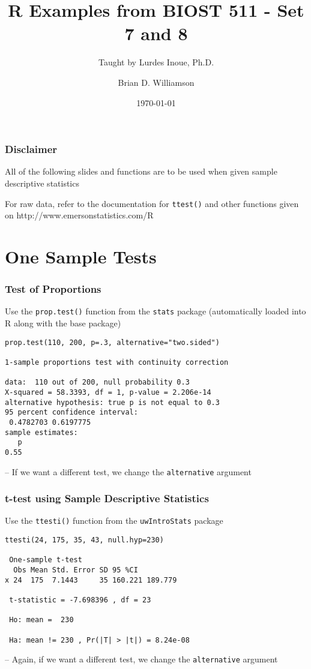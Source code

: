 \documentclass[pdf]{beamer}
\title{R Examples from BIOST 511 - Set 7 and 8}
\subtitle{Taught by Lurdes Inoue, Ph.D.}
\author{Brian D. Williamson}
\institute{University of Washington \\ Department of Biostatistics}
\date{\today}
\begin{document}
\begin{frame}
\titlepage
\end{frame}

\begin{frame}
\frametitle{Disclaimer}
All of the following slides and functions are to be used when given sample descriptive statistics

For raw data, refer to the documentation for \texttt{ttest()} and other functions given on http://www.emersonstatistics.com/R
\end{frame}
\section{One Sample Tests}
\begin{frame}[fragile]
\frametitle{Test of Proportions}
Use the \texttt{prop.test()} function from the \texttt{stats} package (automatically loaded into R along with the base package)
{\fontsize{6pt}{7.2}\selectfont
\begin{verbatim}
prop.test(110, 200, p=.3, alternative="two.sided")

1-sample proportions test with continuity correction

data:  110 out of 200, null probability 0.3
X-squared = 58.3393, df = 1, p-value = 2.206e-14
alternative hypothesis: true p is not equal to 0.3
95 percent confidence interval:
 0.4782703 0.6197775
sample estimates:
   p 
0.55 
\end{verbatim}}
-- If we want a different test, we change the \texttt{alternative} argument
\end{frame}

\begin{frame}[fragile]
\frametitle{t-test using Sample Descriptive Statistics}
Use the \texttt{ttesti()} function from the \texttt{uwIntroStats} package
{\fontsize{6pt}{7.2}\selectfont
\begin{verbatim}
ttesti(24, 175, 35, 43, null.hyp=230)

 One-sample t-test 
  Obs Mean Std. Error SD 95 %CI         
x 24  175  7.1443     35 160.221 189.779

 t-statistic = -7.698396 , df = 23 

 Ho: mean =  230 

 Ha: mean != 230 , Pr(|T| > |t|) = 8.24e-08 
\end{verbatim}}
-- Again, if we want a different test, we change the \texttt{alternative} argument
\end{frame}
\end{document}
